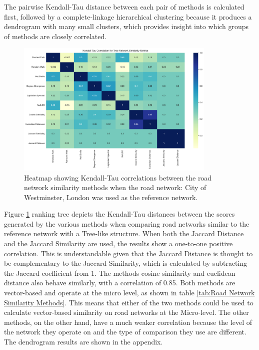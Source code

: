 The pairwise Kendall-Tau distance between each pair of methods is calculated first, followed by a complete-linkage hierarchical clustering because it produces a dendrogram with many small clusters, which provides insight into which groups of methods are closely correlated.

\begin{figure}[!ht]
\centering
\includegraphics[width=0.85\textwidth,center]{picture/Tree/tree2.png}
\caption[Heatmap showing Kendall-Tau correlations between the road network similarity methods for Radial Road Networks]{Heatmap showing Kendall-Tau correlations between the road network similarity methods when the road network: City of Westminster, London was used as the reference network.}
\label{fig:network ranking tree}
\end{figure}

Figure \ref{fig:network ranking tree} ranking tree depicts the Kendall-Tau distances between the scores generated by the various methods when comparing road networks similar to the reference network with a Tree-like structure. When both the Jaccard Distance and the Jaccard Similarity are used, the results show a one-to-one positive correlation. This is understandable given that the Jaccard Distance is thought to be complementary to the Jaccard Similarity, which is calculated by subtracting the Jaccard coefficient from 1. The methods cosine similarity and euclidean distance also behave similarly, with a correlation of 0.85. Both methods are vector-based and operate at the micro level, as shown in table \ref{tab:Road Network Similarity Methods}. This means that either of the two methods could be used to calculate vector-based similarity on road networks at the Micro-level. The other methods, on the other hand, have a much weaker correlation because the level of the network they operate on and the type of comparison they use are different. The dendrogram results are shown in the appendix.

